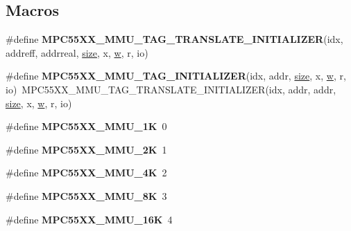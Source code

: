 \subsection*{Macros}
\begin{DoxyCompactItemize}
\item 
\#define {\bfseries M\+P\+C55\+X\+X\+\_\+\+M\+M\+U\+\_\+\+T\+A\+G\+\_\+\+T\+R\+A\+N\+S\+L\+A\+T\+E\+\_\+\+I\+N\+I\+T\+I\+A\+L\+I\+Z\+ER}(idx,  addreff,  addrreal,  \mbox{\hyperlink{sun4u_2tte_8h_a245260f6f74972558f61b85227df5aae}{size}},  x,  \mbox{\hyperlink{sun4u_2tte_8h_aab2ee9ec393223c855b9595e52382ac0}{w}},  r,  io)
\item 
\mbox{\label{regs-mmu_8h_a36962309a9084a83311df8973ddbc5bf}} 
\#define {\bfseries M\+P\+C55\+X\+X\+\_\+\+M\+M\+U\+\_\+\+T\+A\+G\+\_\+\+I\+N\+I\+T\+I\+A\+L\+I\+Z\+ER}(idx,  addr,  \mbox{\hyperlink{sun4u_2tte_8h_a245260f6f74972558f61b85227df5aae}{size}},  x,  \mbox{\hyperlink{sun4u_2tte_8h_aab2ee9ec393223c855b9595e52382ac0}{w}},  r,  io)~M\+P\+C55\+X\+X\+\_\+\+M\+M\+U\+\_\+\+T\+A\+G\+\_\+\+T\+R\+A\+N\+S\+L\+A\+T\+E\+\_\+\+I\+N\+I\+T\+I\+A\+L\+I\+Z\+ER(idx, addr, addr, \mbox{\hyperlink{sun4u_2tte_8h_a245260f6f74972558f61b85227df5aae}{size}}, x, \mbox{\hyperlink{sun4u_2tte_8h_aab2ee9ec393223c855b9595e52382ac0}{w}}, r, io)
\item 
\mbox{\label{regs-mmu_8h_abf918876bbd8b40c9c7649b2c950415b}} 
\#define {\bfseries M\+P\+C55\+X\+X\+\_\+\+M\+M\+U\+\_\+1K}~0
\item 
\mbox{\label{regs-mmu_8h_a1b9ed4deead02d1ce8eab3b197ad4ffb}} 
\#define {\bfseries M\+P\+C55\+X\+X\+\_\+\+M\+M\+U\+\_\+2K}~1
\item 
\mbox{\label{regs-mmu_8h_a969c131c188c144466b4fea7f2dc9862}} 
\#define {\bfseries M\+P\+C55\+X\+X\+\_\+\+M\+M\+U\+\_\+4K}~2
\item 
\mbox{\label{regs-mmu_8h_a525c20d09da588c400181adda56a2a28}} 
\#define {\bfseries M\+P\+C55\+X\+X\+\_\+\+M\+M\+U\+\_\+8K}~3
\item 
\mbox{\label{regs-mmu_8h_aeb931741701256c5f5976cfedb7f4dbe}} 
\#define {\bfseries M\+P\+C55\+X\+X\+\_\+\+M\+M\+U\+\_\+16K}~4
\item 
\mbox{\label{regs-mmu_8h_a4cad261a2eb54b2220db34a12eba1647}} 

\end{DoxyCompactItemize}
